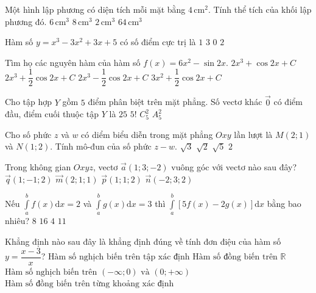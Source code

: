 \begin{ex}%
Một hình lập phương có diện tích mỗi mặt bằng $4\mathrm{\,cm}^2$. Tính thể tích của khối lập phương đó.
\choice
{$6\mathrm{\,cm}^3$}
{\True $8\mathrm{\,cm}^3$}
{$2\mathrm{\,cm}^3$}
{$64\mathrm{\,cm}^3$}

\end{ex}
\begin{ex}%
Hàm số $y=x^3-3 x^2+3 x+5$ có số điểm cực trị là
\choice
{$1$}
{$3$}
{\True $0$}
{$2$}

\end{ex}
\begin{ex}%
Tìm họ các nguyên hàm của hàm số $f(x)=6 x^2-\sin 2 x$.
\choice
{$2 x^3+\cos 2 x+C$}
{\True $2 x^3+\dfrac{1}{2} \cos 2 x+C$}
{$2 x^3-\dfrac{1}{2} \cos 2 x+C$}
{$3 x^2+\dfrac{1}{2} \cos 2 x+C$}

\end{ex}
\begin{ex}%
Cho tập hợp $Y$ gồm $5$ điểm phân biệt trên mặt phẳng. Số vectơ khác $\overrightarrow{0}$ có điểm đầu, điểm cuối thuộc tập $Y$ là
\choice
{$25$}
{$5!$}
{$C_5^2$}
{\True $A_5^2$}

\end{ex}
\begin{ex}%
Cho số phức $z$ và $w$ có diểm biểu diễn trong mặt phẳng $O x y$ lần lượt là $M(2; 1)$ và $N(1; 2)$. Tính mô-đun của số phức $z-w$.
\choice
{$\sqrt{3}$}
{\True $\sqrt{2}$}
{$\sqrt{5}$}
{$2$}

\end{ex}
\begin{ex}%
Trong không gian $Oxyz$, vectơ $\vec{a}(1; 3;-2)$ vuông góc với vectơ nào sau đây?
\choice
{$\vec{q}(1;-1; 2)$}
{$\vec{m}(2; 1; 1)$}
{\True $\vec{p}(1; 1; 2)$}
{$\vec{n}(-2; 3; 2)$}

\end{ex}
\begin{ex}%
Nếu $\displaystyle\int\limits_a^{b} f(x) \mathrm{d} x=2$ và $\displaystyle\int\limits_a^{b} g(x) \mathrm{d} x=3$ thì $\displaystyle\int\limits_a^{b}[5 f(x)-2 g(x)] \mathrm{d} x$ bằng bao nhiêu?
\choice
{$8$}
{$16$}
{\True $4$}
{$11$}

\end{ex}
\begin{ex}%
Khẳng định nào sau đây là khẳng định đúng về tính đơn điệu của hàm số $y=\dfrac{x-3}{x}$?
\choice
{$\text{Hàm số nghịch biến trên tập xác định}$}
{$\text{Hàm số đồng biến trên}$ $\mathbb{R}$}
{$\text{Hàm số nghịch biến trên}$ $(-\infty; 0)$ $\text{và}$ $(0;+\infty)$}
{\True $\text{Hàm số đồng biến trên từng khoảng xác định}$}

\end{ex}
